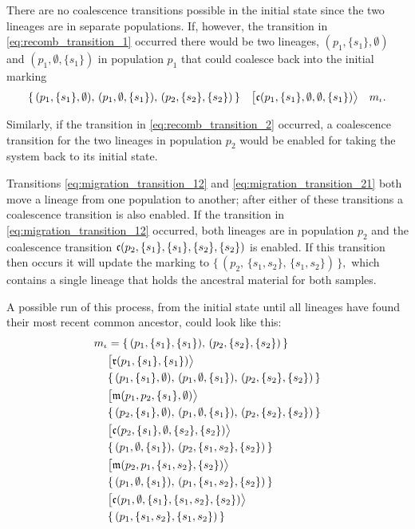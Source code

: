There are no coalescence transitions possible in the initial state since the two lineages are in separate populations. If, however, the transition in \eqref{eq:recomb_transition_1} occurred there would be two lineages, $(p_1,\{s_1\},\emptyset)$ and $(p_1,\emptyset,\{s_1\})$ in population $p_1$ that could coalesce back into the initial marking
\[
    \{\,(p_1,\{s_1\},\emptyset),\,
        (p_1,\emptyset,\{s_1\}),\,
        (p_2,\{s_2\},\{s_2\})\,\}
    \quad
    \big[\mathfrak{c}(p_1,\{s_1\},\emptyset,\emptyset,\{s_1\})\big\rangle 
    \quad
    m_\iota
    .
\]

Similarly, if the transition in \eqref{eq:recomb_transition_2} occurred, a coalescence transition for the two lineages in population $p_2$ would be enabled for taking the system back to its initial state.

Transitions \eqref{eq:migration_transition_12} and \eqref{eq:migration_transition_21} both move a lineage from one population to another; after either of these transitions a coalescence transition is also enabled. If the transition in \eqref{eq:migration_transition_12} occurred, both lineages are in population $p_2$ and the coalescence transition $\mathfrak{c}(p_2,\{s_1\},\{s_1\},\{s_2\},\{s_2\})$ is enabled. If this transition then occurs it will update the marking to
\(
    \{\,(p_2,\,\{s_1,s_2\},\,\{s_1,s_2\})\,\}
    ,
\)
which contains a single lineage that holds the ancestral material for both samples.

A possible run of this process, from the initial state until all lineages have found their most recent common ancestor, could look like this:
\begin{align}
    \nonumber
    m_\iota &= \{\,(p_1,\{s_1\},\{s_1\}),\,(p_2,\{s_2\},\{s_2\})\,\}
    \\ %
    &\big[\recombtrans(p_1,\{s_1\},\{s_1\})\big\rangle
    \label{eq:ex_recomb_1}
    \\
    \nonumber
    &
    \{\,(p_1,\{s_1\},\emptyset),\,
        (p_1,\emptyset,\{s_1\}),\,
        (p_2,\{s_2\},\{s_2\})\,
    \}
    \\ %
    &\big[\migtrans(p_1,p_2,\{s_1\},\emptyset)\big\rangle
    \label{eq:ex_mig_1}
    \\
    \nonumber
    &
    \{\,(p_2,\{s_1\},\emptyset),\,
        (p_1,\emptyset,\{s_1\}),\,
        (p_2,\{s_2\},\{s_2\})\,
    \}
    \\ %
    &\big[\coaltrans(p_2,\{s_1\},\emptyset,\{s_2\},\{s_2\})\big\rangle
    \label{eq:ex_coal_1}
    \\
    \nonumber
    &
    \{\,(p_1,\emptyset,\{s_1\}),\,
        (p_2,\{s_1,s_2\},\{s_2\})\,
    \}
    \\ %
    &\big[\migtrans(p_2,p_1,\{s_1,s_2\},\{s_2\})\big\rangle
    \label{eq:ex_mig_2}
    \\
    \nonumber
    &
    \{\,(p_1,\emptyset,\{s_1\}),\,
        (p_1,\{s_1,s_2\},\{s_2\})\,
    \}
    \\ %
    &\big[\coaltrans(p_1,\emptyset,\{s_1\},\{s_1,s_2\},\{s_2\})\big\rangle
    \label{eq:ex_coal_2}
    \\
    \nonumber
    &
    \{\,
        (p_1,\{s_1,s_2\},\{s_1,s_2\})\,
    \}
\end{align}

